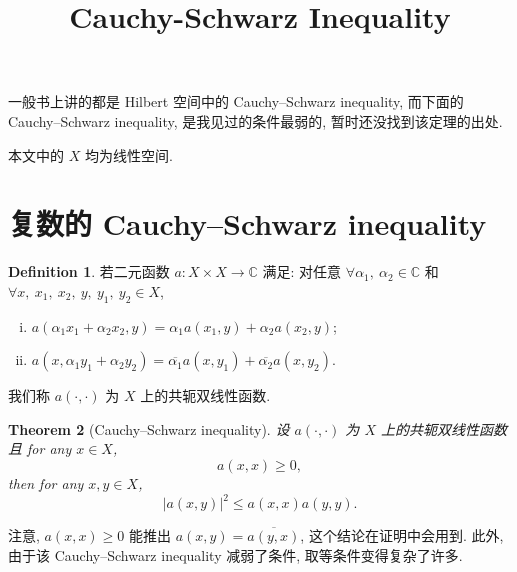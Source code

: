 \documentclass[a4paper,12pt]{article}
\title{Cauchy-Schwarz Inequality}
\newtheorem{theorem}{Theorem}[section]
\theoremstyle{definition}
\newtheorem{definition}[theorem]{Definition}
\begin{document}
\begin{CJK*}{UTF8}{gbsn}

\maketitle

一般书上讲的都是 Hilbert 空间中的 Cauchy–Schwarz inequality, 
而下面的 Cauchy–Schwarz inequality, 是我见过的条件最弱的, 暂时还没找到该定理的出处.

本文中的 $ X $ 均为线性空间.

\section{复数的 Cauchy–Schwarz inequality}

\begin{definition}
    若二元函数 $ a: X \times X \to \mathbb{C} $ 满足: 
    对任意 $ \forall \alpha_1,\ \alpha_2 \in \mathbb{C} $ 和 $ \forall x,\ x_1,\ x_2,\ y,\ y_1,\ y_2 \in X $,
    \begin{enumerate}[(i)]
        \item $ a(\alpha_1 x_1 + \alpha_2 x_2, y) = \alpha_1 a(x_1, y) + \alpha_2 a(x_2, y) $;
        \item $ a(x, \alpha_1 y_1 + \alpha_2 y_2) = \overline{\alpha_1} a(x, y_1) + \overline{\alpha_2} a(x, y_2) $.
    \end{enumerate}
    我们称 $ a(\cdot, \cdot) $ 为 $ X $ 上的共轭双线性函数.
\end{definition}

\begin{theorem}[Cauchy–Schwarz inequality]
    设 $ a(\cdot, \cdot) $ 为 $ X $ 上的共轭双线性函数且 for any $ x \in X $,
    $$
        a(x, x) \geq 0,
    $$
    then for any $  x, y \in X $,
    \begin{equation} \label{result}
        |a(x, y)|^2 \leq a(x, x) a(y, y).
    \end{equation}
\end{theorem}

注意, $ a(x, x) \geq 0 $ 能推出 $ a(x, y) = \overline{a(y, x)} $, 这个结论在证明中会用到.
此外, 由于该 Cauchy–Schwarz inequality 减弱了条件, 取等条件变得复杂了许多.


\end{CJK*}
\end{document}
